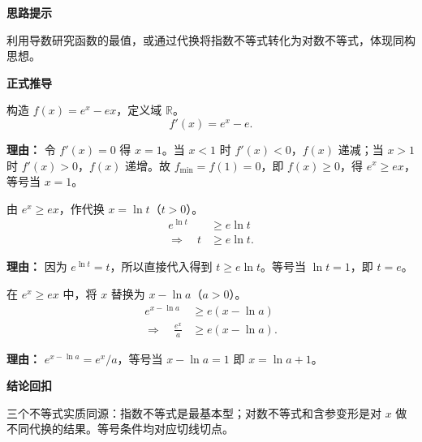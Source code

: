\begin{proofbox}
	\textbf{\textcolor{CProof}{思路提示}}

	利用导数研究函数的最值，或通过代换将指数不等式转化为对数不等式，体现同构思想。

	\medskip
	\textbf{\textcolor{CProof}{正式推导}}
	\begin{description}[style=nextline, leftmargin=2.8em, labelsep=0.5em, itemsep=0.55em]
		\item[\textbf{步骤一（构造函数证指数）：}] 构造 $f(x)=e^x-ex$，定义域 $\mathbb{R}$。
			\[
				f'(x)=e^x-e.
			\]
			\par\textbf{理由：}
			令 $f'(x)=0$ 得 $x=1$。当 $x<1$ 时 $f'(x)<0$，$f(x)$ 递减；当 $x>1$ 时 $f'(x)>0$，$f(x)$ 递增。故 $f_{\min}=f(1)=0$，即 $f(x)\ge 0$，得 $e^x\ge ex$，等号当 $x=1$。

		\item[\textbf{步骤二（代换证对数）：}] 由 $e^x\ge ex$，作代换 $x=\ln t$（$t>0$）。
			\[
				\begin{aligned}
					e^{\ln t} &\ge e\ln t \\
					\Longrightarrow\quad t &\ge e\ln t.
			\end{aligned}
			\]
			\par\textbf{理由：}
			因为 $e^{\ln t}=t$，所以直接代入得到 $t\ge e\ln t$。等号当 $\ln t=1$，即 $t=e$。

		\item[\textbf{步骤三（代换得含参变形）：}] 在 $e^x\ge ex$ 中，将 $x$ 替换为 $x-\ln a$（$a>0$）。
			\[
				\begin{aligned}
					e^{x-\ln a} &\ge e(x-\ln a) \\
					\Longrightarrow\quad \frac{e^x}{a} &\ge e(x-\ln a).
			\end{aligned}
			\]
			\par\textbf{理由：}
			$e^{x-\ln a}=e^x / a$，等号当 $x-\ln a=1$ 即 $x=\ln a+1$。
	\end{description}

	\medskip
	\textbf{\textcolor{CProof}{结论回扣}}

	三个不等式实质同源：指数不等式是最基本型；对数不等式和含参变形是对 $x$ 做不同代换的结果。等号条件均对应切线切点。
\end{proofbox}
